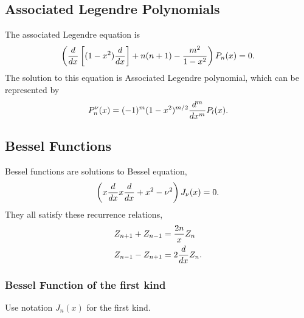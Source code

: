 \documentclass[letterpaper,10pt,english]{sphinxmanual}
\begin{document}
\subsection{Associated Legendre Polynomials}
\label{special-functions:associated-legendre-polynomials}
The associated Legendre equation is
\begin{gather}
\begin{split}\left(\frac{d}{dx}\left[(1-x^2)\frac{d}{dx}\right] + n(n+1) - \frac{m^2}{1-x^2} \right) P_n(x) = 0.\end{split}\notag
\end{gather}
The solution to this equation is Associated Legendre polynomial, which can be represented by
\begin{gather}
\begin{split}P_n^{\nu}(x) = (-1)^m(1-x^2)^{m/2} \frac{d^m}{dx^m} P_l(x) .\end{split}\notag
\end{gather}

\subsection{Bessel Functions}
\label{special-functions:bessel-functions}
Bessel functions are solutions to Bessel equation,
\begin{gather}
\begin{split}\left( x \frac{d}{dx} x \frac{d}{dx} + x^2 - \nu^2 \right) J_{\nu} (x) = 0.\end{split}\notag
\end{gather}
They all satisfy these recurrence relations,
\begin{gather}
\begin{split}Z_{n+1} + Z_{n-1} &= \frac{2n}{x} Z_n  \\
Z_{n-1} - Z_{n+1} & = 2 \frac{d}{dx}Z_n .\end{split}\notag
\end{gather}

\subsubsection{Bessel Function of the first kind}
\label{special-functions:bessel-function-of-the-first-kind}
Use notation \(J_n(x)\) for the first kind.
\end{document}
